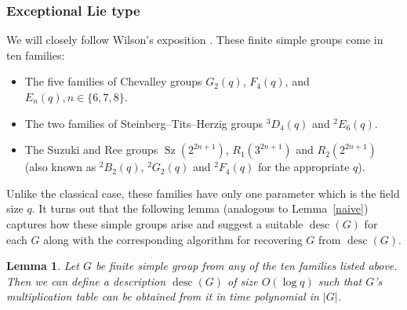 \documentclass{elsarticle}
\newtheorem{lemma}[theorem]{Lemma}
\newcommand{\desc}{\mathop{\mathrm{desc}}}
\newcommand{\Sz}{\mathop{\mathrm{Sz}}\nolimits}
\begin{document}
\subsubsection{Exceptional Lie type}

We will closely follow Wilson's exposition \cite[Chapter 4]{Wilson-book}.
These finite simple groups come in ten families:
  \begin{itemize}
  \item The five families of Chevalley groups $G_2(q)$, $F_4(q)$, and $E_n(q),
    n\in\{6,7,8\}$.
  \item The two families of Steinberg--Tits--Herzig groups ${}^3{D}_4(q)$ and
${}^2{E}_6(q)$.
  \item The Suzuki and Ree groups $\Sz(2^{2n+1})$, $R_1(3^{2n+1})$ and $R_2(2^{2n+1})$ (also known as ${}^2B_2(q)$, ${}^2G_2(q)$ and ${}^2F_4(q)$ for the
appropriate $q$).
  \end{itemize}

  Unlike the classical case, these families have only one parameter
  which is the field size $q$. It turns out that the following lemma
  (analogous to Lemma~\ref{naive}) captures how these simple groups
  arise and suggest a suitable $\desc(G)$ for each $G$ along with
  the corresponding algorithm for recovering $G$ from $\desc(G)$.

  \begin{lemma}\label{except}
    Let $G$ be finite simple group from any of the ten families listed
    above. Then we can define a description $\desc(G)$ of size $O(\log q)$
    such that $G$'s multiplication table can be obtained from it in
    time polynomial in $|G|$.
  \end{lemma}
\end{document}
